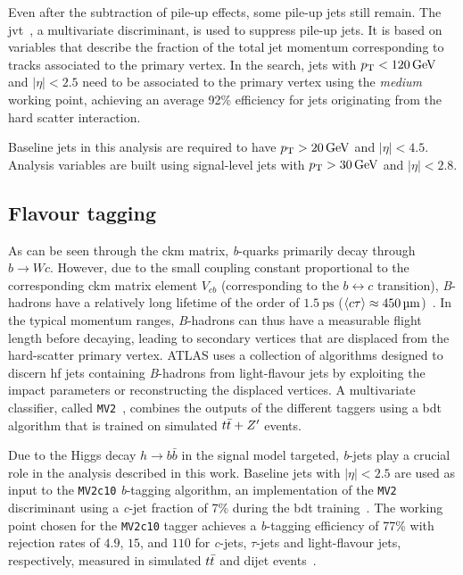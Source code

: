 Even after the subtraction of pile-up effects, some pile-up jets still remain. The \gls{jvt}~\cite{PERF-2014-03}, a multivariate discriminant, is used to suppress pile-up jets.
It is based on variables that describe the fraction of the total jet momentum corresponding to tracks associated to the primary vertex.
In the \onelepton search, jets with $\pt < \SI{120}{\GeV}$ and $\vert\eta\vert < 2.5$ need to be associated to the primary vertex using the \textit{medium}~\cite{Aad:2020flx} working point, achieving an average 92\% efficiency for jets originating from the hard scatter interaction.

Baseline jets in this analysis are required to have $\pt > \SI{20}{\GeV}$ and $\vert\eta\vert < 4.5$. Analysis variables are built using signal-level jets with $\pt > \SI{30}{\GeV}$ and $\vert\eta\vert < 2.8$.

\subsection{Flavour tagging}\label{sec:flavour_tagging}

As can be seen through the \gls{ckm} matrix, \textit{b}-quarks primarily decay through $b\rightarrow W c$.
However, due to the small coupling constant proportional to the corresponding \gls{ckm} matrix element $V_{cb}$ (corresponding to the $b \leftrightarrow c $ transition), \textit{B}-hadrons have a relatively long lifetime of the order of $\SI{1.5}{\pico\second}$ ($\braket{c\tau} \approx \SI{450}{\micro\meter}$)~\cite{pdg2020}.
In the typical momentum ranges, \textit{B}-hadrons can thus have a measurable flight length before decaying, leading to secondary vertices that are displaced from the hard-scatter primary vertex.
ATLAS uses a collection of algorithms designed to discern \gls{hf} jets containing \textit{B}-hadrons from light-flavour jets by exploiting the impact parameters or reconstructing the displaced vertices.
A multivariate classifier, called \texttt{MV2}~\cite{ATL-PHYS-PUB-2017-013}, combines the outputs of the different taggers using a \gls{bdt} algorithm that is trained on simulated $t\bar{t} + Z'$ events. 

Due to the Higgs decay $h\rightarrow b\bar{b}$ in the signal model targeted, \textit{b}-jets play a crucial role in the analysis described in this work.
Baseline jets with $\vert\eta\vert < 2.5$ are used as input to the \texttt{MV2c10} \textit{b}-tagging algorithm, an implementation of the \texttt{MV2} discriminant using a \textit{c}-jet fraction of 7\% during the \gls{bdt} training~\cite{FTAG-2018-01, PERF-2016-05}.
The working point chosen for the \texttt{MV2c10} tagger achieves a \textit{b}-tagging efficiency of 77\% with rejection rates of $4.9$, $15$, and $110$ for \textit{c}-jets, $\tau$-jets and light-flavour jets, respectively, measured in simulated $t\bar{t}$ and dijet events~\cite{FTAG-2018-01}.

